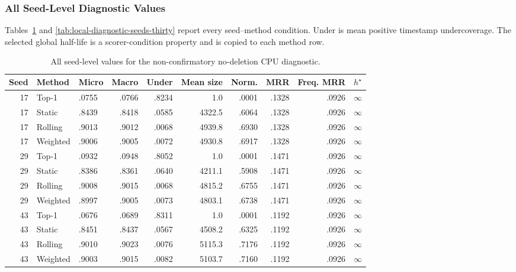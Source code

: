 \subsubsection{All Seed-Level Diagnostic Values}
\label{sec:local-diagnostic-seeds}

Tables~\ref{tab:local-diagnostic-seeds-zero} and
\ref{tab:local-diagnostic-seeds-thirty} report every seed--method condition.
Under is mean positive timestamp undercoverage. The selected global half-life
is a scorer-condition property and is copied to each method row.

\begin{table}[t]
\centering
\caption{All seed-level values for the non-confirmatory no-deletion CPU
diagnostic.}
\label{tab:local-diagnostic-seeds-zero}
\scriptsize
\setlength{\tabcolsep}{3.1pt}
\begin{tabular}{rllrrrrrrl}
\toprule
Seed & Method & Micro & Macro & Under & Mean size & Norm. & MRR & Freq. MRR & \(h^\star\)\\
\midrule
17 & Top-1 & .0755 & .0766 & .8234 & 1.0 & .0001 & .1328 & .0926 & \(\infty\)\\
17 & Static & .8439 & .8418 & .0585 & 4322.5 & .6064 & .1328 & .0926 & \(\infty\)\\
17 & Rolling & .9013 & .9012 & .0068 & 4939.8 & .6930 & .1328 & .0926 & \(\infty\)\\
17 & Weighted & .9006 & .9005 & .0072 & 4930.8 & .6917 & .1328 & .0926 & \(\infty\)\\
29 & Top-1 & .0932 & .0948 & .8052 & 1.0 & .0001 & .1471 & .0926 & \(\infty\)\\
29 & Static & .8386 & .8361 & .0640 & 4211.1 & .5908 & .1471 & .0926 & \(\infty\)\\
29 & Rolling & .9008 & .9015 & .0068 & 4815.2 & .6755 & .1471 & .0926 & \(\infty\)\\
29 & Weighted & .8997 & .9005 & .0073 & 4803.1 & .6738 & .1471 & .0926 & \(\infty\)\\
43 & Top-1 & .0676 & .0689 & .8311 & 1.0 & .0001 & .1192 & .0926 & \(\infty\)\\
43 & Static & .8451 & .8437 & .0567 & 4508.2 & .6325 & .1192 & .0926 & \(\infty\)\\
43 & Rolling & .9010 & .9023 & .0076 & 5115.3 & .7176 & .1192 & .0926 & \(\infty\)\\
43 & Weighted & .9003 & .9015 & .0082 & 5103.7 & .7160 & .1192 & .0926 & \(\infty\)\\
\bottomrule
\end{tabular}
\end{table}

